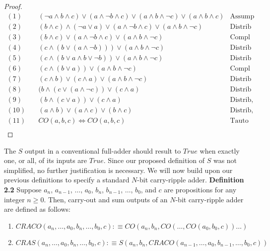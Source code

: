 \documentclass{article}
\begin{document}
\begin{proof}
	\begin{align*}
		(1) &  \quad (\lnot a \land b \land c) \lor (a \land \lnot b \land c) \lor (a \land b \land \lnot c) \lor (a \land b \land c) & \text{Assump} \\
		(2) & \quad (b \land c) \land (\lnot a \lor a) \lor (a \land \lnot b \land c) \lor (a \land b \land \lnot c) & \text{Distrib} \\
		(3) & \quad (b \land c) \lor (a \land \lnot b \land c) \lor (a \land b \land \lnot c) & \text{Compl} \\
		(4) & \quad (c \land (b \lor (a \land \lnot b)))  \lor (a \land b \land \lnot c) & \text{Distrib} \\
		(5) & \quad (c \land (b \lor a \land b \lor \lnot b))  \lor (a \land b \land \lnot c) & \text{Distrib} \\
		(6) & \quad (c \land (b \lor a))  \lor (a \land b \land \lnot c) & \text{Compl} \\
		(7) & \quad (c \land b) \lor (c \land a) \lor (a \land b \land \lnot c) & \text{Distrib} \\
		(8) & \quad (b \land (c \lor (a \land \lnot c)) \lor (c \land a)  & \text{Distrib} \\
		(9) & \quad (b \land (c \lor a)) \lor (c \land a)  & \text{Distrib, Compl} \\
		(10) & \quad  (a \land b) \lor (a \land c) \lor (b \land c) & \text{Distrib, Commut} \\
		(11) & \quad  CO(a, b, c) \iff CO(a, b, c) & \text{Tauto} \\
	\end{align*}
\end{proof}

The $S$ output in a conventional full-adder should result to $True$ when exactly one, or all, of its inputs are $True$. Since our proposed definition of $S$ was not simplified, no further justification is necessary. We will now build upon our previous definitions to specify a standard $N$-bit carry-ripple adder.
\newpage
\noindent \textbf{Definition 2.2} Suppose $a_n$, $a_{n-1}$, $\ldots$, $a_0$, $b_n$, $b_{n-1}$, $\ldots$, $b_0$, and $c$ are propositions for any integer $ n \geq 0$. Then, carry-out and sum outputs of an $N$-bit carry-ripple adder are defined as follows: 
\begin{enumerate}
	\item $ CRACO(a_n, \ldots, a_0, b_n, \ldots, b_0, c) :\equiv CO(a_n, b_n, CO(\ldots, CO(a_0, b_0, c))\ldots)$
	\item $ CRAS(a_n, \ldots, a_0, b_n, \ldots, b_0, c) :\equiv S(a_n, b_n, CRACO(a_{n-1}, \ldots, a_0, b_{n-1}, \ldots, b_0, c)) $
\end{enumerate}
\end{document}
